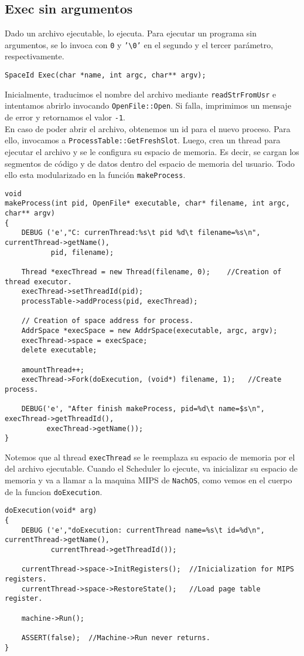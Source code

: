\subsection*{Exec sin argumentos}
Dado un archivo ejecutable, lo ejecuta. Para ejecutar un programa sin argumentos, se lo invoca con \texttt{0} y \texttt{'\textbackslash 0'} en el segundo y el tercer parámetro, respectivamente.\\
\begin{lstlisting}[style=C]
SpaceId Exec(char *name, int argc, char** argv);
\end{lstlisting}
Inicialmente, traducimos el nombre del archivo mediante \texttt{readStrFromUsr} e intentamos abrirlo invocando \texttt{OpenFile::Open}. Si falla, imprimimos un mensaje de error y retornamos el valor \texttt{-1}.\\
En caso de poder abrir el archivo, obtenemos un id para el nuevo proceso. Para ello, invocamos a \texttt{ProcessTable::GetFreshSlot}. Luego, crea un thread para ejecutar el archivo y se le configura su espacio de memoria. Es decir, se cargan los segmentos de código y de datos dentro del espacio de memoria del usuario. Todo ello esta modularizado en la función \texttt{makeProcess}.
\begin{lstlisting}[style=C]
void
makeProcess(int pid, OpenFile* executable, char* filename, int argc, char** argv)
{
    DEBUG ('e',"C: currenThread:%s\t pid %d\t filename=%s\n", currentThread->getName(),
           pid, filename);
    
    Thread *execThread = new Thread(filename, 0);    //Creation of thread executor.
    execThread->setThreadId(pid);
    processTable->addProcess(pid, execThread);

    // Creation of space address for process.
    AddrSpace *execSpace = new AddrSpace(executable, argc, argv);
    execThread->space = execSpace;
    delete executable;

    amountThread++;
    execThread->Fork(doExecution, (void*) filename, 1);   //Create process.

    DEBUG('e', "After finish makeProcess, pid=%d\t name=$s\n", execThread->getThreadId(),
          execThread->getName());
}
\end{lstlisting}
Notemos que al thread \texttt{execThread} se le reemplaza su espacio de memoria por el del archivo ejecutable. Cuando el Scheduler lo ejecute, va inicializar su espacio de memoria y va a llamar a la maquina MIPS de \texttt{NachOS}, como vemos en el cuerpo de la funcion \texttt{doExecution}.
\begin{lstlisting}[style=C]
doExecution(void* arg)
{
    DEBUG ('e',"doExecution: currentThread name=%s\t id=%d\n", currentThread->getName(),
           currentThread->getThreadId());

	currentThread->space->InitRegisters();  //Inicialization for MIPS registers.
	currentThread->space->RestoreState();   //Load page table register.

 	machine->Run();	

    ASSERT(false);  //Machine->Run never returns.
}
\end{lstlisting}
